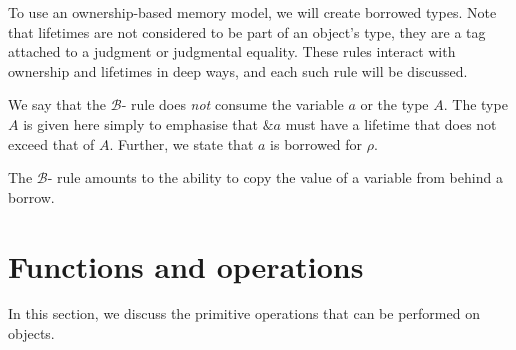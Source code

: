 \documentclass[11pt]{book}
\begin{document}
To use an ownership-based memory model, we will create borrowed types.
Note that lifetimes are not considered to be part of an object's type, they are a tag attached to a judgment or judgmental equality.
These rules interact with ownership and lifetimes in deep ways, and each such rule will be discussed.


We say that the $\mathcal B$-\rintro{} rule does \textit{not} consume the variable \( a \) or the type \( A \).
The type \( A \) is given here simply to emphasise that \( \& a \) must have a lifetime that does not exceed that of \( A \).
Further, we state that \( a \) is borrowed for \( \rho \).
The $\mathcal B$-\relim{} rule amounts to the ability to copy the value of a variable from behind a borrow.


\section{Functions and operations}

In this section, we discuss the primitive operations that can be performed on objects.
\end{document}
